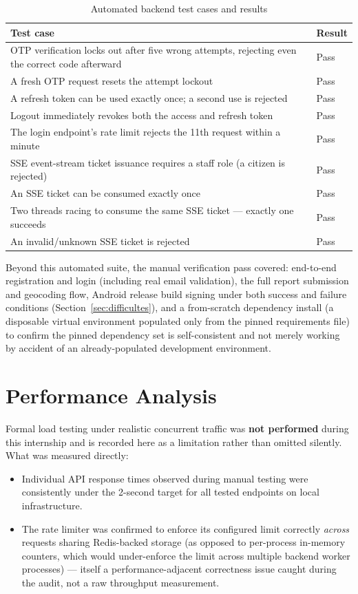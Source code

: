 \begin{table}[h!]
\centering
\begin{tabularx}{\textwidth}{Xl}
\toprule
\textbf{Test case} & \textbf{Result} \\
\midrule
OTP verification locks out after five wrong attempts, rejecting even the correct code afterward & Pass \\
A fresh OTP request resets the attempt lockout & Pass \\
A refresh token can be used exactly once; a second use is rejected & Pass \\
Logout immediately revokes both the access and refresh token & Pass \\
The login endpoint's rate limit rejects the 11th request within a minute & Pass \\
SSE event-stream ticket issuance requires a staff role (a citizen is rejected) & Pass \\
An SSE ticket can be consumed exactly once & Pass \\
Two threads racing to consume the same SSE ticket --- exactly one succeeds & Pass \\
An invalid/unknown SSE ticket is rejected & Pass \\
\bottomrule
\end{tabularx}
\caption{Automated backend test cases and results}
\label{tab:testcases}
\end{table}

Beyond this automated suite, the manual verification pass covered: end-to-end registration and login (including real email validation), the full report submission and geocoding flow, Android release build signing under both success and failure conditions (Section~\ref{sec:difficultes}), and a from-scratch dependency install (a disposable virtual environment populated only from the pinned requirements file) to confirm the pinned dependency set is self-consistent and not merely working by accident of an already-populated development environment.

\section{Performance Analysis}

Formal load testing under realistic concurrent traffic was \textbf{not performed} during this internship and is recorded here as a limitation rather than omitted silently. What was measured directly:

\begin{itemize}[leftmargin=*]
  \item Individual API response times observed during manual testing were consistently under the 2-second target for all tested endpoints on local infrastructure.
  \item The rate limiter was confirmed to enforce its configured limit correctly \emph{across} requests sharing Redis-backed storage (as opposed to per-process in-memory counters, which would under-enforce the limit across multiple backend worker processes) --- itself a performance-adjacent correctness issue caught during the audit, not a raw throughput measurement.
\end{itemize}


